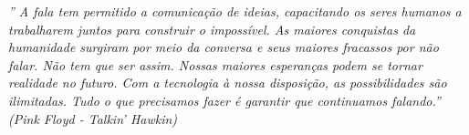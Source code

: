 \begin{epigrafe}
  \vspace*{\fill}
  \begin{flushright}
    \textit{'' A fala tem permitido a comunicação de ideias, capacitando os seres humanos a trabalharem juntos para construir o impossível. As maiores conquistas da humanidade surgiram por meio da conversa e seus maiores fracassos por não falar. Não tem que ser assim. Nossas maiores esperanças podem se tornar realidade no futuro. Com a tecnologia à nossa disposição, as possibilidades são ilimitadas. Tudo o que precisamos fazer é garantir que continuamos falando.''\\
      (Pink Floyd - Talkin' Hawkin)}
  \end{flushright}
\end{epigrafe}

